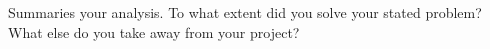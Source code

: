 Summaries your analysis. To what extent did you solve your stated
problem? What else do you take away from your project?